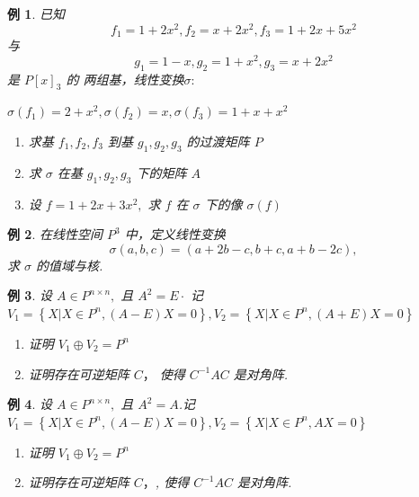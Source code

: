 \documentclass[13pt]{beamer}
\newtheorem{exa}{例}
\begin{document}
\begin{frame}
\begin{exa}
已知 $$f_{1}=1+2 x^{2}, f_{2}=x+2 x^{2}, f_{3}=1+2 x+5 x^{2}$$ 与 $$g_{1}=1-x, g_{2}=1+x^{2}, g_{3}=x+2 x^{2}$$ 是 $P[x]_{3}$ 的
两组基，线性变换$ \sigma: $
\begin{center}
$\sigma\left(f_{1}\right)=2+x^{2}, \sigma\left(f_{2}\right)=x, \sigma\left(f_{3}\right)=1+x+x^{2}$
\end{center}
\begin{enumerate}
\item  求基 $f_{1}, f_{2}, f_{3}$ 到基 $g_{1}, g_{2}, g_{3}$ 的过渡矩阵 $P$
\item  求 $\sigma$ 在基 $g_{1}, g_{2}, g_{3}$ 下的矩阵 $A$
\item  设 $f=1+2 x+3 x^{2},$ 求 $f$ 在 $\sigma$ 下的像 $\sigma(f)$
\end{enumerate}
\end{exa}
\end{frame}

\begin{frame}
\begin{exa}
	在线性空间 $P^{3}$ 中，定义线性变换 $$\sigma(a, b, c)=(a+2 b-c, b+c, a+b-2 c),$$ 求 $\sigma$ 的值域与核.
\end{exa}
\end{frame}

\begin{frame}
\begin{exa}
设 $A \in P^{n \times n},$ 且 $A^{2}=E \cdot$ 记 $V_{1}=\left\{X | X \in P^{n},(A-E) X=0\right\}, V_{2}=\left\{X | X \in P^{n},(A+E) X=0\right\}$
\begin{enumerate}
\item  证明 $V_{1} \oplus V_{2}=P^{n}$
\item 证明存在可逆矩阵 $C ，$ 使得 $C^{-1} A C$ 是对角阵.
\end{enumerate}
\end{exa} 
\begin{exa}
设 $A \in P^{n \times n},$ 且 $A^{2}=A$.记 $V_{1}=\left\{X | X \in P^{n},(A-E) X=0\right\}, V_{2}=\left\{X | X \in P^{n}, A X=0\right\}$
\begin{enumerate}
\item  证明 $V_{1} \oplus V_{2}=P^{n}$
\item 证明存在可逆矩阵 $C ，$, 使得 $C^{-1} A C$ 是对角阵.
\end{enumerate}
\end{exa}
\end{frame}
\end{document}
